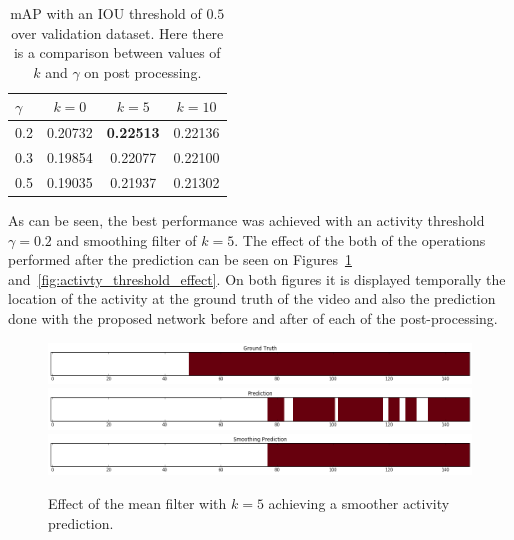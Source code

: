 \begin{table}[H]
\begin{center}
\begin{tabular}{|l|c|c|c|}
\hline
$\gamma$ & $k=0$ & $k=5$ & $k=10$ \\
\hline
0.2 & 0.20732 & \bf0.22513 & 0.22136 \\
0.3 & 0.19854 & 0.22077 & 0.22100 \\
0.5 & 0.19035 & 0.21937 & 0.21302 \\
\hline
\end{tabular}
\end{center}
\caption{mAP with an IOU threshold of $0.5$ over validation dataset. Here there is a comparison
between values of $k$ and $\gamma$ on post processing.}
\label{table:detection_postprocessing_comparison}
\end{table}

As can be seen, the best performance was achieved with an activity threshold $\gamma=0.2$ and smoothing filter of $k=5$. The effect of the both of the operations performed after the prediction can be seen on Figures~\ref{fig:smoothing_effect} and~\ref{fig:activty_threshold_effect}. On both figures it is displayed temporally the location of the activity at the ground truth of the video and also the prediction done with the proposed network before and after of each of the post-processing.

\begin{figure}[H]
\begin{center}
\includegraphics[width=1\linewidth]{img/results/smoothing_effect_4}
\includegraphics[width=1\linewidth]{img/results/smoothing_effect_5}
\includegraphics[width=1\linewidth]{img/results/smoothing_effect_6}
\end{center}
\caption{Effect of the mean filter with $k=5$ achieving a smoother activity prediction.}
\label{fig:smoothing_effect}
\end{figure}

